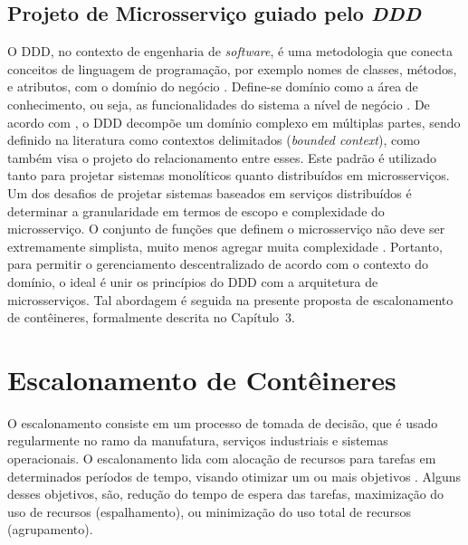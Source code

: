 \subsection{Projeto de Microsserviço guiado pelo \textit{DDD}}
O \ac{DDD}, no contexto de engenharia de \textit{software}, é uma metodologia que conecta conceitos de linguagem de programação, por exemplo nomes de classes, métodos, e atributos, com o domínio do negócio \cite{DDD}. Define-se domínio como a área de conhecimento, ou seja, as funcionalidades do sistema a nível de negócio \cite{evans2014domain}.
%
De acordo com , o \ac{DDD} decompõe um domínio complexo em múltiplas partes, sendo definido na literatura como contextos delimitados (\textit{bounded context}), como também visa o projeto do relacionamento entre esses. Este padrão é utilizado tanto para projetar sistemas monolíticos quanto distribuídos em microsserviços. 
Um dos desafios de projetar sistemas baseados em serviços distribuídos é determinar a granularidade em termos de escopo e complexidade do microsserviço. O conjunto de funções que definem o microsserviço não deve ser extremamente simplista, muito menos agregar muita complexidade \cite{merson2020modeling}. Portanto, para permitir o gerenciamento descentralizado de acordo com o contexto do domínio, o ideal é unir os princípios do \ac{DDD} com a arquitetura de microsserviços.
%
Tal abordagem é seguida na presente proposta de escalonamento de contêineres, formalmente descrita no Capítulo~3.

\section{Escalonamento de Contêineres}

O escalonamento consiste em um processo de tomada de decisão, que é usado regularmente no ramo da manufatura, serviços industriais e sistemas operacionais. O escalonamento lida com alocação de recursos para tarefas em determinados períodos de tempo, visando otimizar um ou mais objetivos \cite{pinedo2012scheduling}. Alguns desses objetivos, são, redução do tempo de espera das tarefas, maximização do uso de recursos (espalhamento), ou minimização do uso total de recursos (agrupamento).

